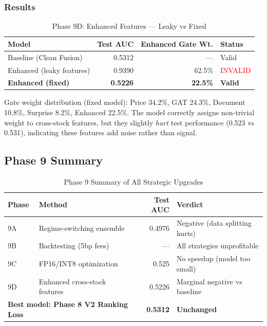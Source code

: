 \documentclass[12pt,a4paper]{article}
\begin{document}
\subsubsection{Results}

\begin{table}[H]
\centering
\caption{Phase 9D: Enhanced Features --- Leaky vs Fixed}
\begin{tabular}{lrrl}
\toprule
\textbf{Model} & \textbf{Test AUC} & \textbf{Enhanced Gate Wt.} & \textbf{Status} \\
\midrule
Baseline (Clean Fusion)   & 0.5312 & --- & Valid \\
Enhanced (leaky features) & 0.9390 & 62.5\% & \textcolor{red}{INVALID} \\
\textbf{Enhanced (fixed)} & \textbf{0.5226} & \textbf{22.5\%} & \textbf{Valid} \\
\bottomrule
\end{tabular}
\end{table}

\noindent Gate weight distribution (fixed model): Price 34.2\%, GAT 24.3\%, Document 10.8\%, 
Surprise 8.2\%, Enhanced 22.5\%. The model correctly assigns non-trivial weight to cross-stock 
features, but they slightly \textit{hurt} test performance (0.523 vs 0.531), indicating these 
features add noise rather than signal.

\subsection{Phase 9 Summary}

\begin{table}[H]
\centering
\caption{Phase 9 Summary of All Strategic Upgrades}
\begin{tabular}{llrl}
\toprule
\textbf{Phase} & \textbf{Method} & \textbf{Test AUC} & \textbf{Verdict} \\
\midrule
9A & Regime-switching ensemble      & 0.4976 & Negative (data splitting hurts) \\
9B & Backtesting (5bp fees)         & ---    & All strategies unprofitable \\
9C & FP16/INT8 optimization         & 0.525  & No speedup (model too small) \\
9D & Enhanced cross-stock features  & 0.5226 & Marginal negative vs baseline \\
\midrule
\multicolumn{2}{l}{\textbf{Best model: Phase 8 V2 Ranking Loss}} & \textbf{0.5312} & \textbf{Unchanged} \\
\bottomrule
\end{tabular}
\end{table}
\end{document}
